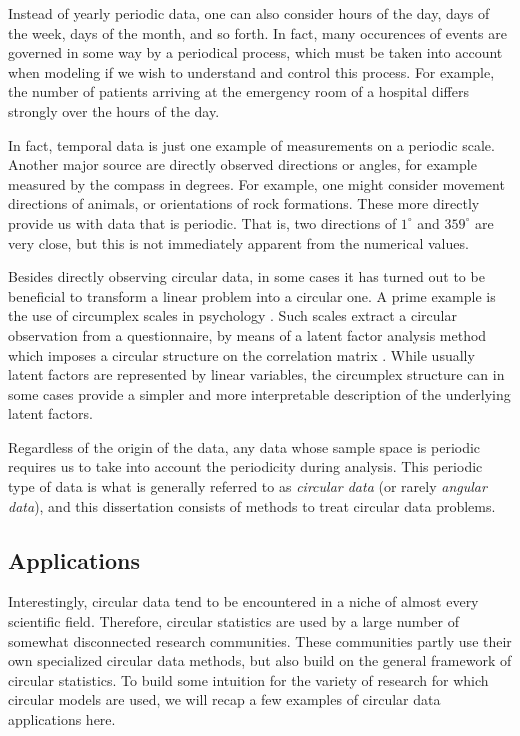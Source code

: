 \documentclass[12pt, a4paper]{book}\usepackage[]{graphicx}\usepackage{xcolor}
\begin{document}
Instead of yearly periodic data, one can also consider hours of the day, days of the week, days of the month, and so forth. In fact, many occurences of events are governed in some way by a periodical process, which must be taken into account when modeling if we wish to understand and control this process. For example, the number of patients arriving at the emergency room of a hospital differs strongly over the hours of the day.

In fact, temporal data is just one example of measurements on a periodic scale. Another major source are directly observed directions or angles, for example measured by the compass in degrees. For example, one might consider movement directions of animals, or orientations of rock formations. These more directly provide us with data that is periodic. That is, two directions of $1^\circ$ and $359^\circ$ are very close, but this is not immediately apparent from the numerical values.

Besides directly observing circular data, in some cases it has turned out to be beneficial to transform a linear problem into a circular one. A prime example is the use of circumplex scales in psychology \citep{gurtmancircumplex}. Such scales extract a circular observation from a questionnaire, by means of a latent factor analysis method which imposes a circular structure on the correlation matrix \citep{browne1992circumplex}. While usually latent factors are represented by linear variables, the circumplex structure can in some cases provide a simpler and more interpretable description of the underlying latent factors.

Regardless of the origin of the data, any data whose sample space is periodic requires us to  take into account the periodicity during analysis. This periodic type of data is what is generally referred to as \textit{circular data} (or rarely \textit{angular data}), and this dissertation consists of methods to treat circular data problems.

\subsection*{Applications}

Interestingly, circular data tend to be encountered in a niche of almost every scientific field. Therefore, circular statistics are used by a large number of somewhat disconnected research communities. These communities partly use their own specialized circular data methods, but also build on the general framework of circular statistics. To build some intuition for the variety of research for which circular models are used, we will recap a few examples of circular data applications here.
\end{document}
